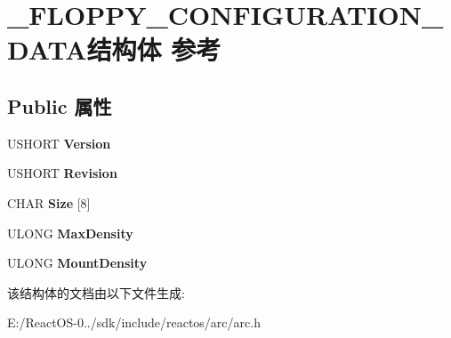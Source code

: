 \hypertarget{struct___f_l_o_p_p_y___c_o_n_f_i_g_u_r_a_t_i_o_n___d_a_t_a}{}\section{\+\_\+\+F\+L\+O\+P\+P\+Y\+\_\+\+C\+O\+N\+F\+I\+G\+U\+R\+A\+T\+I\+O\+N\+\_\+\+D\+A\+T\+A结构体 参考}
\label{struct___f_l_o_p_p_y___c_o_n_f_i_g_u_r_a_t_i_o_n___d_a_t_a}
\subsection*{Public 属性}
\begin{DoxyCompactItemize}
\item 
\mbox{\label{struct___f_l_o_p_p_y___c_o_n_f_i_g_u_r_a_t_i_o_n___d_a_t_a_a4559ae2bb239c7ad5e68f1a85e8e4258}} 
U\+S\+H\+O\+RT {\bfseries Version}
\item 
\mbox{\label{struct___f_l_o_p_p_y___c_o_n_f_i_g_u_r_a_t_i_o_n___d_a_t_a_a682a10fab4ea5dd5b5a3920a715ee56d}} 
U\+S\+H\+O\+RT {\bfseries Revision}
\item 
\mbox{\label{struct___f_l_o_p_p_y___c_o_n_f_i_g_u_r_a_t_i_o_n___d_a_t_a_adc1050a1df1c7cd74138116754bf2533}} 
C\+H\+AR {\bfseries Size} \mbox{[}8\mbox{]}
\item 
\mbox{\label{struct___f_l_o_p_p_y___c_o_n_f_i_g_u_r_a_t_i_o_n___d_a_t_a_ab1e3a18d0d25d161528390b3f6d8784b}} 
U\+L\+O\+NG {\bfseries Max\+Density}
\item 
\mbox{\label{struct___f_l_o_p_p_y___c_o_n_f_i_g_u_r_a_t_i_o_n___d_a_t_a_ac84b41dee3f2c02e0bc1b8f8403fdb6b}} 
U\+L\+O\+NG {\bfseries Mount\+Density}
\end{DoxyCompactItemize}


该结构体的文档由以下文件生成\+:\begin{DoxyCompactItemize}
\item 
E\+:/\+React\+O\+S-\/0../sdk/include/reactos/arc/arc.\+h\end{DoxyCompactItemize}
